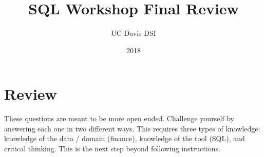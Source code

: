 \documentclass[10pt]{exam}
\begin{document}
 
\title{SQL Workshop Final Review}
\author{UC Davis DSI}
\date{2018}

\maketitle

\section{Review}

    These questions are meant to be more open ended. Challenge yourself by
    answering each one in two different ways. This requires three types of
    knowledge: knowledge of the data / domain (finance), knowledge of the
    tool (SQL), and critical thinking. This is the next step beyond following
    instructions.
\end{document}
